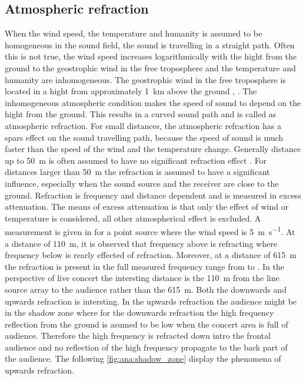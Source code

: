 \subsection{Atmospheric refraction} \label{sec:ana:atm_ref}
When the wind speed, the temperature and humanity is assumed to be homogeneous in the sound field, the sound is travelling in a straight path. Often this is not true, the wind speed increases logarithmically with the hight from the ground to the geostrophic wind \citep{asmos_acous_2016} in the free troposphere \citep{spr_hand_book} and the temperature and humanity are inhomogeneous. The geostrophic wind in the free troposphere is located in a hight from approximately \SI{1}{\kilo\meter} above the ground \citep{spr_hand_book}, \citep{geostrophic_wind}. The inhomogeneous atmospheric condition makes the speed of sound to depend on the hight from the ground. This results in a curved sound path and is called as atmospheric refraction. For small distances, the atmospheric refraction has a spars effect on the sound travelling path, because the speed of sound is much faster than the speed of the wind and the temperature change. Generally distance up to \SI{50}{\meter} is often assumed to have no significant refraction effect \citep{effect_of_wind}. For distances larger than \SI{50}{\meter} the refraction is assumed to have a significant influence, especially when the sound source and the receiver are close to the ground. Refraction is frequency and distance dependent and is measured in \db excess attenuation. The means of excess attenuation is that only the effect of wind or temperature is considered, all other atmospherical effect is excluded. A measurement is given in \citep{review_of_sound} for a point source where the wind speed is \SI{5}{\meter\per\second}. At a distance of \SI{110}{\meter}, it is observed that frequency above  is refracting where frequency below is rearly effected of refraction. Moreover, at a distance of \SI{615}{\meter} the refraction is present in the full measured frequency range from  to . In the perspective of live concert the intersting distance is the \SI{110}{\meter} from the line source array to the audience rather than the \SI{615}{\meter}. Both the downwards and upwards refraction is intersting. In the upwards refraction the audience might be in the shadow zone where for the downwards refraction the high frequency reflection from the ground is asumed to be low when the concert area is full of audience. Therefore the high frequency is refracted down intro the frontal audience and no reflection of the high frequency propagate to the back part of the audience. The following \autoref{fig:ana:shadow_zone} display the phenomena of upwards refraction.


